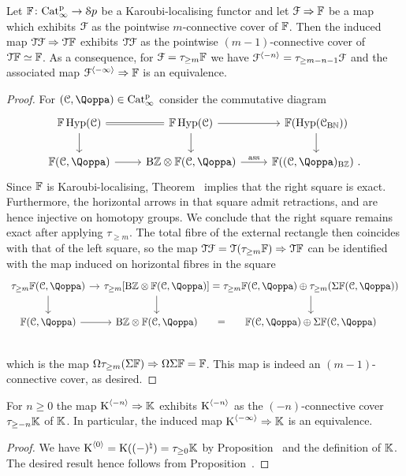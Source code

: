 \begin{proposition}
\label{proposition:connective-covers}%
Let $\mathbb{F}\colon \mathrm{Cat}^{\mathrm p}_\infty \to {\mathcal Sp}$ be a Karoubi-localising functor and let $\mathcal{F} \Rightarrow \mathbb{F}$ be a map which exhibits $\mathcal{F}$ as the pointwise $m$-connective cover of $\mathbb{F}$. Then the induced map $\mathcal{T}\mathcal{F} \Rightarrow \mathcal{T}\mathbb{F}$ exhibits $\mathcal{T}\mathcal{F}$ as the pointwise $(m-1)$-connective cover of $\mathcal{T}\mathbb{F} \simeq \mathbb{F}$. 
As a consequence, for $\mathcal{F} = \tau_{\geq m}\mathbb{F}$ we have $\mathcal{F}^{\langle -n \rangle} = \tau_{\geq m-n-1}\mathcal{F}$ and the associated map
$\mathcal{F}^{\langle -\infty \rangle} \Rightarrow \mathbb{F}$ is an equivalence.
\end{proposition}
\begin{proof}
For $(\C,\QF) \in \Catp$ consider the commutative diagram
\[
\begin{tikzcd}
\FF\Hyp(\C)\ar[r,equal]\ar[d]  & \FF\Hyp(\C) \ar[r]\ar[d] & \FF(\Hyp(\C_{\B\NN}))\ar[d] \\
\FF(\C,\QF) \ar[r] & {\B\ZZ} \otimes \FF(\C,\QF) \ar[r, "\ass"] & \FF((\C,\QF)_{\B\ZZ}) \ .
\end{tikzcd}
\]
Since $\mathbb{F}$ is Karoubi-localising, Theorem~ implies that the right square is exact. Furthermore, the horizontal arrows in that square admit retractions, and are hence injective on homotopy groups. We conclude that the right square remains exact after applying $\tau_{\geq m}$. The total fibre of the external rectangle then coincides with that of the left square, so the map $\mathcal{T}\mathcal{F} = \mathcal{T}(\tau_{\geq m}\mathbb{F}) \Rightarrow \mathcal{T}\mathbb{F}$ can be identified with the map induced on horizontal fibres in the square
\[
\begin{tikzcd}[column sep=5pt]
\tau_{\geq m}\FF(\C,\QF) \ar[rr]\ar[d] && \tau_{\geq m}[{\B\ZZ} \otimes \FF(\C,\QF)] \ar[r,phantom, "="]\ar[d] & \tau_{\geq m}\FF(\C,\QF) \oplus \tau_{\geq m}(\Sig\FF(\C,\QF))\ar[d] \\
\FF(\C,\QF) \ar[rr] && \B\ZZ \otimes \FF(\C,\QF) \ar[r,phantom, "="] & \FF(\C,\QF) \oplus \Sig\FF(\C,\QF) \\
\end{tikzcd}
\]
which is the map $\Omega\tau_{\geq m}(\Sigma\mathbb{F}) \Rightarrow \Omega\Sigma\mathbb{F}=\mathbb{F}$. This map is indeed an $(m-1)$-connective cover, as desired.
\end{proof}


\begin{corollary}
\label{corollary:decorated-K}%
For $n \geq 0$ the map $\operatorname K^{\langle -n \rangle} \Rightarrow \mathbb K$ exhibits $\operatorname K^{\langle -n \rangle}$ as the $(-n)$-connective cover $\tau_{\geq -n}\mathbb K$ of $\mathbb K$. 
In particular, the induced map 
$\operatorname K^{\langle -\infty \rangle} \Rightarrow \mathbb K$ is an equivalence.
\end{corollary}
\begin{proof}
We have $\operatorname K^{\langle 0 \rangle} = \operatorname K((-)^{\natural}) = \tau_{\geq 0}\mathbb K$ by Proposition~ and the definition of $\mathbb K$. The desired result hence follows from Proposition~.
\end{proof}

